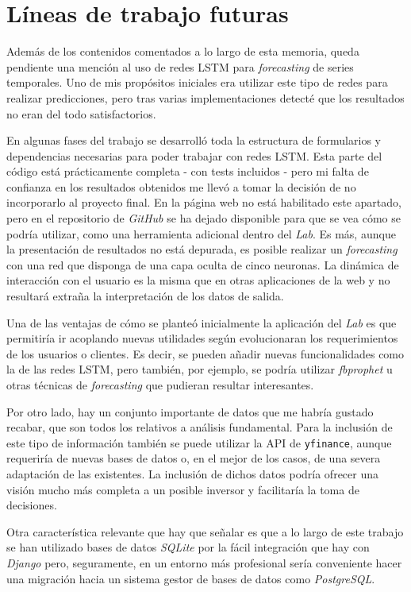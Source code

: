 \section{Líneas de trabajo futuras} 

Además de los contenidos comentados a lo largo de esta memoria, queda pendiente una mención al uso de redes LSTM\citep{wiki:lstm} para \emph{forecasting} de series temporales. Uno de mis propósitos iniciales era utilizar este tipo de redes para realizar predicciones, pero tras varias implementaciones detecté que los resultados no eran del todo satisfactorios. 

En algunas fases del trabajo se desarrolló toda la estructura de formularios y dependencias necesarias para poder trabajar con redes LSTM. Esta parte del código está prácticamente completa - con tests incluidos - pero mi falta de confianza en los resultados obtenidos me llevó a tomar la decisión de no incorporarlo al proyecto final. En la página web no está habilitado este apartado, pero en el repositorio de \emph{GitHub} se ha dejado disponible para que se vea cómo se podría utilizar, como una herramienta adicional dentro del \emph{Lab}. Es más, aunque la presentación de resultados no está depurada, es posible realizar un \emph{forecasting} con una red que disponga de una capa oculta de cinco neuronas. La dinámica de interacción con el usuario es la misma que en otras aplicaciones de la web y no resultará extraña la interpretación de los datos de salida. 

Una de las ventajas de cómo se planteó inicialmente la aplicación del \emph{Lab} es que permitiría ir acoplando nuevas utilidades según evolucionaran los requerimientos de los usuarios o clientes. Es decir, se pueden añadir nuevas funcionalidades como la de las redes LSTM, pero también, por ejemplo, se podría utilizar \emph{fbprophet}\citep{online:fbprophet} u otras técnicas de \emph{forecasting} que pudieran resultar interesantes. 

Por otro lado, hay un conjunto importante de datos que me habría gustado recabar, que son todos los relativos a análisis fundamental\citep{wiki:analisis_fundamental}. Para la inclusión de este tipo de información también se puede utilizar la API de \texttt{yfinance}, aunque requeriría de nuevas bases de datos o, en el mejor de los casos, de una severa adaptación de las existentes. La inclusión de dichos datos podría ofrecer una visión mucho más completa a un posible inversor y facilitaría la toma de decisiones.

Otra característica relevante que hay que señalar es que a lo largo de este trabajo se han utilizado bases de datos \emph{SQLite} por la fácil integración que hay con \emph{Django} pero, seguramente, en un entorno más profesional sería conveniente hacer una migración hacia un sistema gestor de bases de datos como \emph{PostgreSQL}. 

